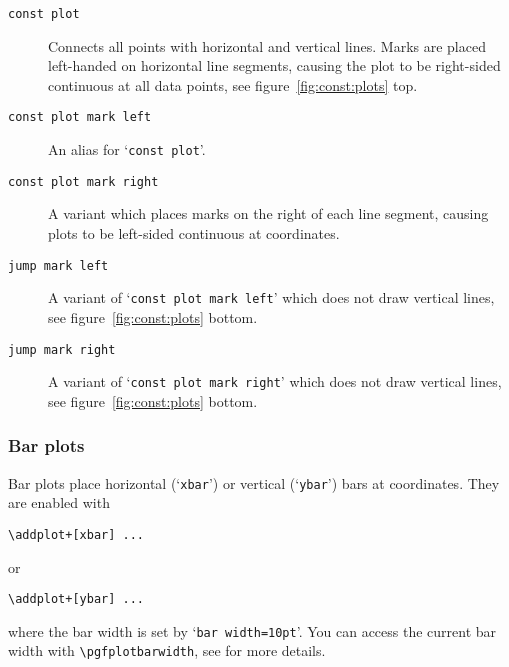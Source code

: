 \begin{description}
\item[\texttt{const plot}] Connects all points with horizontal and vertical lines. Marks are placed left-handed on horizontal line segments, causing the plot to be right-sided continuous at all data points, see figure~\ref{fig:const:plots} top.
\item[\texttt{const plot mark left}] An alias for `\texttt{const plot}'.
\item[\texttt{const plot mark right}] A variant which places marks on the right of each line segment, causing plots to be left-sided continuous at coordinates.
\item[\texttt{jump mark left}] A variant of `\texttt{const plot mark left}' which does not draw vertical lines, see figure~\ref{fig:const:plots} bottom.
\item[\texttt{jump mark right}]A variant of `\texttt{const plot mark right}' which does not draw vertical lines, see figure~\ref{fig:const:plots} bottom.
\end{description}

\subsubsection{Bar plots}
Bar plots place horizontal (`\texttt{xbar}') or vertical (`\texttt{ybar}') bars at coordinates. They are enabled with
\begin{lstlisting}
\addplot+[xbar] ...
\end{lstlisting}
or
\begin{lstlisting}
\addplot+[ybar] ...
\end{lstlisting}
where the bar width is set by `\lstinline!bar width=10pt!'. You can access the current bar width with \lstinline!\pgfplotbarwidth!, see \cite[section~18.8]{tikz} for more details.

